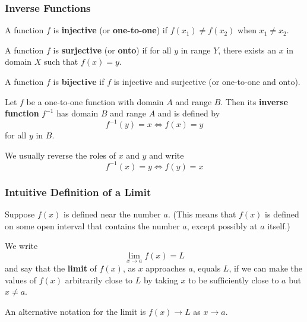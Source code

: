 \subsubsection*{Inverse Functions}
\begin{definition}
    A function \(f\) is \textbf{injective} (or \textbf{one-to-one}) if
    \(f(x_1)\neq f(x_2)\) when \(x_1\neq x_2\).
\end{definition}
\begin{definition}
    A function \(f\) is \textbf{surjective} (or \textbf{onto}) if for all
    \(y\) in range \(Y\),
    there exists an \(x\) in domain \(X\) such that \(f(x)=y\).
\end{definition}
\begin{definition}
    A function \(f\) is \textbf{bijective} if \(f\) is injective and
    surjective (or one-to-one and onto).
\end{definition}
\begin{definition}
    Let \(f\) be a one-to-one function with domain \(A\) and range \(B\).
    Then its \textbf{inverse function} \(f^{-1}\) has domain \(B\) and range
    \(A\) and is defined by
    \[f^{-1}(y)=x\iff f(x)=y\]
    for all \(y\) in \(B\).
\end{definition}
We usually reverse the roles of \(x\) and \(y\) and write
\[f^{-1}(x)=y\iff f(y)=x\]

\subsubsection*{Intuitive Definition of a Limit}
Suppose \(f(x)\) is defined near the number \(a\).
(This means that \(f(x)\) is defined on some open interval that contains the
number \(a\),
except possibly at \(a\) itself.)
\begin{definition}
    We write
    \[\lim_{x\to a}f(x)=L\]
    and say that the \textbf{limit} of \(f(x)\),
    as \(x\) approaches \(a\),
    equals \(L\),
    if we can make the values of \(f(x)\) arbitrarily close to \(L\) by taking
    \(x\) to be sufficiently close to \(a\) but \(x\neq a\).
\end{definition}
An alternative notation for the limit is \(f(x)\to L\) as \(x\to a\).

